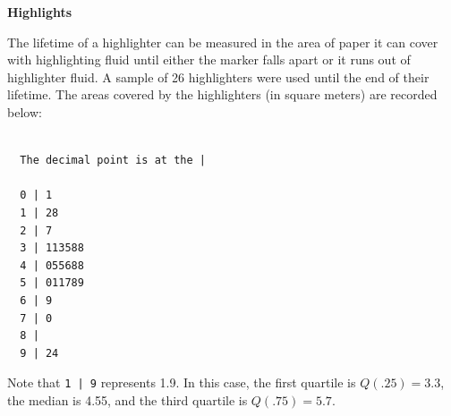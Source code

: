 \documentclass[addpoints]{examsetup}\usepackage[]{graphicx}\usepackage[]{color}
\makeatletter
\newenvironment{kframe}{%
 \def\at@end@of@kframe{}%
 \ifinner\ifhmode%
  \def\at@end@of@kframe{\end{minipage}}%
  \begin{minipage}{\columnwidth}%
 \fi\fi%
 \def\FrameCommand##1{\hskip\@totalleftmargin \hskip-\fboxsep
 \colorbox{shadecolor}{##1}\hskip-\fboxsep
     \hskip-\linewidth \hskip-\@totalleftmargin \hskip\columnwidth}%
 \MakeFramed {\advance\hsize-\width
   \@totalleftmargin\z@ \linewidth\hsize
   \@setminipage}}%
 {\par\unskip\endMakeFramed%
 \at@end@of@kframe}
\newenvironment{knitrout}{}{} %
\makeatother
\begin{document}
\begin{questions}
\pagebreak

\question 

\textbf{Highlights}



The lifetime of a highlighter can be measured in the area of paper it can cover with highlighting fluid until either the marker falls apart or it runs out of highlighter fluid.
A sample of 26 highlighters were used until the end of their lifetime. The areas covered by the highlighters (in square meters) are recorded below:

\begin{knitrout}
\color{fgcolor}\begin{kframe}
\begin{verbatim}

  The decimal point is at the |

  0 | 1
  1 | 28
  2 | 7
  3 | 113588
  4 | 055688
  5 | 011789
  6 | 9
  7 | 0
  8 | 
  9 | 24
\end{verbatim}
\end{kframe}
\end{knitrout}

Note that \verb!1 | 9! represents 1.9. In this case, the first quartile is $Q(.25) = 3.3$, 
the median is 4.55, and the third quartile is $Q(.75) = 5.7$.

\end{questions}
\end{document}
